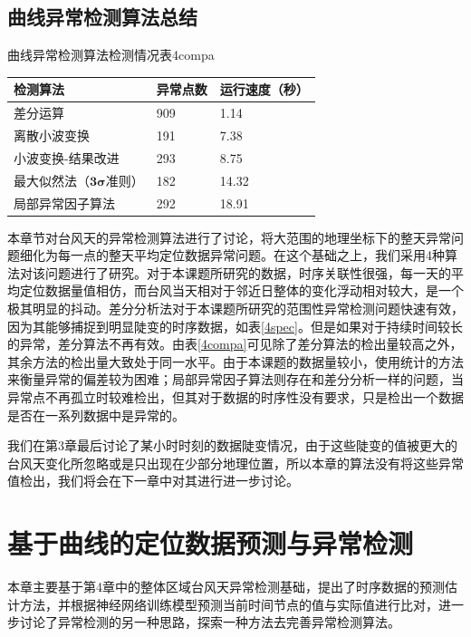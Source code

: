 \documentclass[a4paper,AutoFakeBold,oneside,12pt]{book}
\begin{document}
\section{曲线异常检测算法总结}


\begin{bupttable}{曲线异常检测算法检测情况表}{4compa}
    \begin{tabular}{l|l|l}
		\hline \textbf{检测算法} & \textbf{异常点数}  & \textbf{运行速度（秒）} \\
		\hline 差分运算 & 909 & 1.14\\
		\hline 离散小波变换 & 191 & 7.38 \\
		\hline 小波变换-结果改进 & 293 & 8.75 \\
		\hline 最大似然法（$\bm{3\sigma}$准则） & 182 & 14.32\\
		\hline 局部异常因子算法 & 292  & 18.91\\
		\hline
    \end{tabular}
\end{bupttable}

	本章节对台风天的异常检测算法进行了讨论，将大范围的地理坐标下的整天异常问题细化为每一点的整天平均定位数据异常问题。在这个基础之上，我们采用4种算法对该问题进行了研究。对于本课题所研究的数据，时序关联性很强，每一天的平均定位数据量值相仿，而台风当天相对于邻近日整体的变化浮动相对较大，是一个极其明显的抖动。差分分析法对于本课题所研究的范围性异常检测问题快速有效，因为其能够捕捉到明显陡变的时序数据，如表\ref{4spec}。但是如果对于持续时间较长的异常，差分算法不再有效。由表\ref{4compa}可见除了差分算法的检出量较高之外，其余方法的检出量大致处于同一水平。由于本课题的数据量较小，使用统计的方法来衡量异常的偏差较为困难；局部异常因子算法则存在和差分分析一样的问题，当异常点不再孤立时较难检出，但其对于数据的时序性没有要求，只是检出一个数据是否在一系列数据中是异常的。


	我们在第3章最后讨论了某小时时刻的数据陡变情况，由于这些陡变的值被更大的台风天变化所忽略或是只出现在少部分地理位置，所以本章的算法没有将这些异常值检出，我们将会在下一章中对其进行进一步讨论。

\chapter{基于曲线的定位数据预测与异常检测}
	本章主要基于第4章中的整体区域台风天异常检测基础，提出了时序数据的预测估计方法，并根据神经网络训练模型预测当前时间节点的值与实际值进行比对，进一步讨论了异常检测的另一种思路，探索一种方法去完善异常检测算法。
\end{document}
